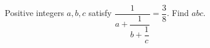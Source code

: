 Positive integers $a,b,c$ satisfy $\dfrac{1}{a+\dfrac{1}{b+\dfrac{1}{c}}}=\dfrac{3}{8}$. Find $abc$.
